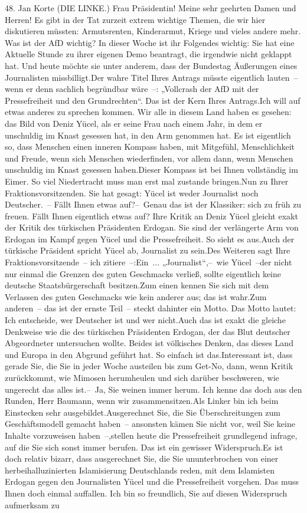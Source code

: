 \documentclass{article}
\begin{document}
	48. Jan Korte (DIE LINKE.) Frau Präsidentin! Meine sehr geehrten Damen und Herren! Es gibt in der Tat zurzeit extrem wichtige Themen, die wir hier diskutieren müssten: Armutsrenten, Kinderarmut, Kriege und vieles andere mehr. Was ist der AfD wichtig? In dieser Woche ist ihr Folgendes wichtig: Sie hat eine Aktuelle Stunde zu ihrer eigenen Demo beantragt, die irgendwie nicht geklappt hat. Und heute möchte sie unter anderem, dass der Bundestag Äußerungen eines Journalisten missbilligt.Der wahre Titel Ihres Antrags müsste eigentlich lauten – wenn er denn sachlich begründbar wäre –: „Vollcrash der AfD mit der Pressefreiheit und den Grundrechten“. Das ist der Kern Ihres Antrags.Ich will auf etwas anderes zu sprechen kommen. Wir alle in diesem Land haben es gesehen: das Bild von Deniz Yücel, als er seine Frau nach einem Jahr, in dem er unschuldig im Knast gesessen hat, in den Arm genommen hat. Es ist eigentlich so, dass Menschen einen inneren Kompass haben, mit Mitgefühl, Menschlichkeit und Freude, wenn sich Menschen wiederfinden, vor allem dann, wenn Menschen unschuldig im Knast gesessen haben.Dieser Kompass ist bei Ihnen vollständig im Eimer. So viel Niedertracht muss man erst mal zustande bringen.Nun zu Ihrer Fraktionsvorsitzenden. Sie hat gesagt: Yücel ist weder Journalist noch Deutscher. – Fällt Ihnen etwas auf?– Genau das ist der Klassiker: sich zu früh zu freuen. Fällt Ihnen eigentlich etwas auf? Ihre Kritik an Deniz Yücel gleicht exakt der Kritik des türkischen Präsidenten Erdogan. Sie sind der verlängerte Arm von Erdogan im Kampf gegen Yücel und die Pressefreiheit. So sieht es aus.Auch der türkische Präsident spricht Yücel ab, Journalist zu sein.Des Weiteren sagt Ihre Fraktionsvorsitzende – ich zitiere –:Ein ... „Journalist“,– wie Yücel –der nicht nur einmal die Grenzen des guten Geschmacks verließ, sollte eigentlich keine deutsche Staatsbürgerschaft besitzen.Zum einen kennen Sie sich mit dem Verlassen des guten Geschmacks wie kein anderer aus; das ist wahr.Zum anderen – das ist der ernste Teil – steckt dahinter ein Motto. Das Motto lautet: Ich entscheide, wer Deutscher ist und wer nicht.Auch das ist exakt die gleiche Denkweise wie die des türkischen Präsidenten Erdogan, der das Blut deutscher Abgeordneter untersuchen wollte. Beides ist völkisches Denken, das dieses Land und Europa in den Abgrund geführt hat. So einfach ist das.Interessant ist, dass gerade Sie, die Sie in jeder Woche austeilen bis zum Get-No, dann, wenn Kritik zurückkommt, wie Mimosen herumheulen und sich darüber beschweren, wie ungerecht das alles ist.– Ja, Sie weinen immer herum. Ich kenne das doch aus den Runden, Herr Baumann, wenn wir zusammensitzen.Als Linker bin ich beim Einstecken sehr ausgebildet.Ausgerechnet Sie, die Sie Überschreitungen zum Geschäftsmodell gemacht haben – ansonsten kämen Sie nicht vor, weil Sie keine Inhalte vorzuweisen haben –,stellen heute die Pressefreiheit grundlegend infrage, auf die Sie sich sonst immer berufen. Das ist ein gewisser Widerspruch.Es ist doch relativ bizarr, dass ausgerechnet Sie, die Sie ununterbrochen von einer herbeihalluzinierten Islamisierung Deutschlands reden, mit dem Islamisten Erdogan gegen den Journalisten Yücel und die Pressefreiheit vorgehen. Das muss Ihnen doch einmal auffallen. Ich bin so freundlich, Sie auf diesen Widerspruch aufmerksam zu 
\end{document}
